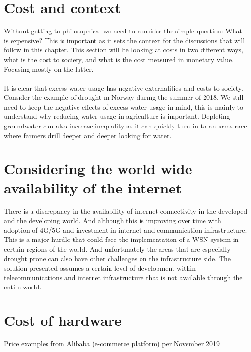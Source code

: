 \documentclass[]{uiophd}
\begin{document}
\section{Cost and context}
Without getting to philosophical we need to consider the simple question: What is expensive? This is important as it sets the context for the discussions that will follow in this chapter. This section will be looking at costs in two different ways, what is the cost to society, and what is the cost measured in monetary value. Focusing mostly on the latter. 
\\\\
It is clear that excess water usage has negative externalities and costs to society. Consider the example of drought in Norway during the summer of 2018. We still need to keep the negative effects of excess water usage in mind, this is mainly to understand why reducing water usage in agriculture is important. Depleting groundwater can also increase inequality as it can quickly turn in to an arms race where farmers drill deeper and deeper looking for water.
\section{Considering the world wide availability of the internet}
There is a discrepancy in the availability of internet connectivity in the developed and the developing world. And although this is improving over time with adoption of 4G/5G and investment in internet and communication infrastructure. This is a major hurdle that could face the implementation of a WSN system in certain regions of the world. And unfortunately the areas that are especially drought prone can also have other challenges on the infrastructure side. The solution presented assumes a certain level of development within telecommunications and internet infrastructure that is not available through the entire world.
\section{Cost of hardware}

Price examples from Alibaba (e-commerce platform) per November 2019
\end{document}

